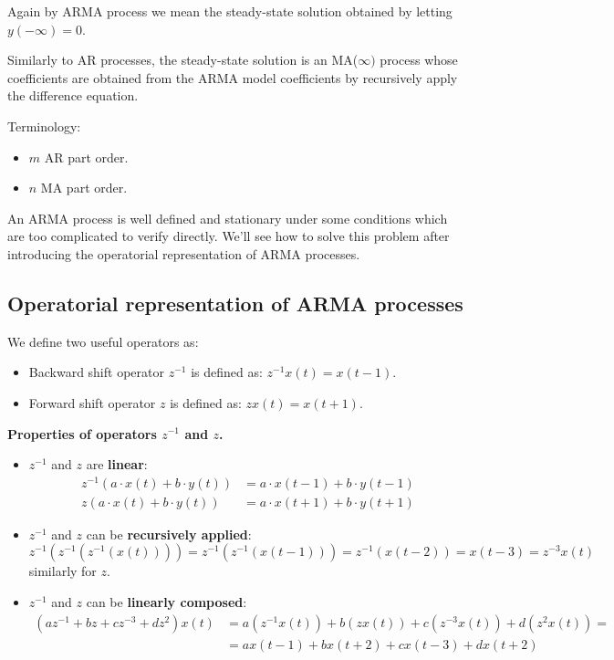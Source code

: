 Again by ARMA process we mean the steady-state solution obtained by letting $y(-\infty)=0$.
 
Similarly to AR processes, the steady-state solution is an MA($\infty)$ process whose coefficients are obtained from the ARMA model coefficients by recursively apply the difference equation.
 
Terminology:
\begin{itemize}
	\item $m$ AR part order.
	\item $n$ MA part order.
\end{itemize}

An ARMA process is well defined and stationary under some conditions which are too complicated to verify directly.
We'll see how to solve this problem after introducing the operatorial representation of ARMA processes.

\subsection{Operatorial representation of ARMA processes}

\begin{definition}
	We define two useful operators as:
	\begin{itemize}
		\item Backward shift operator $z^{-1}$ is defined as: $z^{-1} x(t)=x(t-1)$.
		\item Forward shift operator $z$ is defined as: $z x(t)=x(t+1)$.	
	\end{itemize}
	
\end{definition}

\textbf{Properties of operators $z^{-1}$ and $z$.}

\begin{itemize}
	\item $z^{-1}$ and $z$ are \textbf{linear}:
		\begin{align*}
			z^{-1}(a \cdot x(t)+b \cdot y(t))&=a \cdot x(t-1)+b \cdot y(t-1) \\
			z(a \cdot x(t)+b \cdot y(t))&=a \cdot x(t+1)+b \cdot y(t+1)
		\end{align*}
	\item $z^{-1}$ and $z$ can be \textbf{recursively applied}:
		\[
			z^{-1}(z^{-1}(z^{-1}(x(t))))=z^{-1}(z^{-1}(x(t-1)))=z^{-1}(x(t-2))=x(t-3)=z^{-3} x(t)
		\]
		similarly for $z$.
	\item $z^{-1}$ and $z$ can be \textbf{linearly composed}:
		\begin{align*}
			(a z^{-1}+b z+c z^{-3}+d z^{2}) x(t)&=a(z^{-1} x(t))+b(z x(t))+c(z^{-3} x(t))+d(z^{2} x(t))= \\
			&=a x(t-1)+b x(t+2)+c x(t-3)+d x(t+2)
		\end{align*}
\end{itemize}

